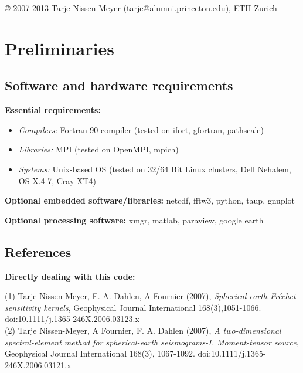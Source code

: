 \documentclass[11pt,letter,fleqn,english,notitlepage]{article}
\begin{document}
\noindent \copyright  \hspace*{0.1cm} 
2007-2013 Tarje Nissen-Meyer (\url{tarje@alumni.princeton.edu}), ETH Zurich

\newpage
\tableofcontents
\newpage

\section{Preliminaries}

\subsection{Software and hardware requirements}

\textbf{Essential requirements:} 
\begin{itemize}
\item \textit{Compilers:} Fortran 90 compiler (tested on ifort, gfortran, pathscale)
\item \textit{Libraries:} MPI (tested on OpenMPI, mpich)
\item \textit{Systems:} Unix-based OS (tested on 32/64 Bit Linux clusters,
  Dell Nehalem, OS X.4-7,  Cray XT4)
\end{itemize}

\textbf{Optional embedded software/libraries:} netcdf, fftw3, python, taup, gnuplot

\textbf{Optional processing software:} xmgr, matlab, paraview, google earth
\subsection{References}

\noindent \textbf{Directly dealing with this code:}\vspace*{0.2cm}

(1) Tarje Nissen-Meyer, F. A. Dahlen, A Fournier (2007),
\textit{Spherical-earth Fr\'{e}chet sensitivity kernels},        
Geophysical Journal International 168(3),1051-1066. 
doi:10.1111/j.1365-246X.2006.03123.x                \\
                                                        
(2) Tarje Nissen-Meyer, A Fournier, F. A. Dahlen (2007), 
\textit{A two-dimensional spectral-element method for
spherical-earth seismograms-I. Moment-tensor source}, 
Geophysical Journal International 168(3), 1067-1092. 
doi:10.1111/j.1365-246X.2006.03121.x                 \\
                                                       
\end{document}
